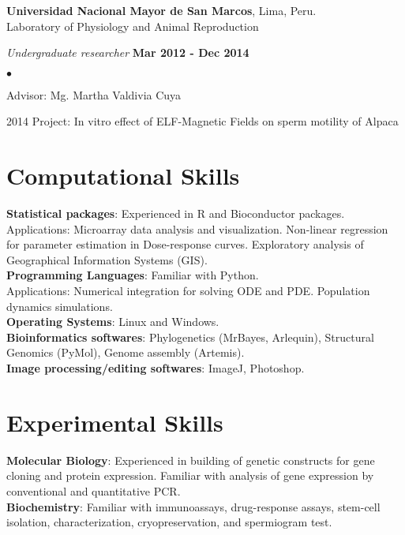 \documentclass[margin,line]{res}
\newenvironment{list1}{
  \begin{list}{\ding{113}}{%
      \setlength{\itemsep}{0in}
      \setlength{\parsep}{0in} \setlength{\parskip}{0in}
      \setlength{\topsep}{0in} \setlength{\partopsep}{0in}
      \setlength{\leftmargin}{0.17in}}}{\end{list}}
\newenvironment{list2}{
  \begin{list}{$\bullet$}{%
      \setlength{\itemsep}{0in}
      \setlength{\parsep}{0in} \setlength{\parskip}{0in}
      \setlength{\topsep}{0in} \setlength{\partopsep}{0in}
      \setlength{\leftmargin}{0.2in}}}{\end{list}}
\begin{document}
\begin{resume}
{\bf Universidad Nacional Mayor de San Marcos}, Lima, Peru.\\
Laboratory of Physiology and Animal Reproduction\\
\vspace*{-.1in}
\begin{list1}
	\item[] {\em Undergraduate researcher} \hfill {\bf Mar 2012 - Dec 2014}\\
	\vspace*{-.1in}
	\begin{list2} %
		\item Advisor: Mg. Martha Valdivia Cuya
		\item 2014 Project: In vitro effect of ELF-Magnetic Fields on sperm motility of Alpaca\\
	\end{list2}
\end{list1}

\section{\sc Computational Skills}
{\bf Statistical packages}: Experienced in R and Bioconductor packages.\\
Applications: Microarray data analysis and visualization. Non-linear regression for parameter estimation in Dose-response curves. Exploratory analysis of Geographical Information Systems (GIS).\\
{\bf Programming Languages}: Familiar with Python.\\
Applications: Numerical integration for solving ODE and PDE. Population dynamics simulations.\\
{\bf Operating Systems}: Linux and Windows.\\
{\bf Bioinformatics softwares}: Phylogenetics (MrBayes, Arlequin), Structural Genomics (PyMol), Genome assembly (Artemis).\\
{\bf Image processing/editing softwares}: ImageJ, Photoshop.

\section{\sc Experimental Skills}
{\bf Molecular Biology}: Experienced in building of genetic constructs for gene cloning and protein expression. Familiar with analysis of gene expression by conventional and quantitative PCR.\\
{\bf Biochemistry}: Familiar with immunoassays, drug-response assays, stem-cell isolation, characterization, cryopreservation, and spermiogram test.\\


\end{resume}
\end{document}
